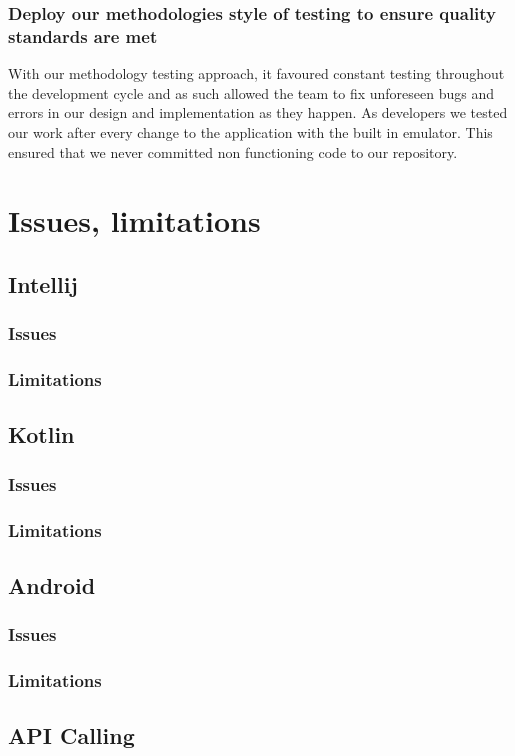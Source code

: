\subsubsection {Deploy our methodologies style of testing to ensure quality standards are met}
With our methodology testing approach, it favoured constant testing throughout the development cycle and as such allowed the team to fix unforeseen bugs and errors in our design and implementation as they happen. As developers we tested our work after every change to the application with the built in emulator. This ensured that we never committed non functioning code to our repository.
\section{Issues, limitations}
\subsection{Intellij}
\subsubsection{Issues}
\subsubsection{Limitations}
\subsection{Kotlin}
\subsubsection{Issues}
\subsubsection{Limitations}
\subsection{Android}
\subsubsection{Issues}
\subsubsection{Limitations}
\subsection{API Calling}
